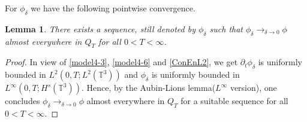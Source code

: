 \documentclass[reqno,a4paper,11pt]{amsart}
\theoremstyle{plain}
\newtheorem{lemma}[theorem]{Lemma}
\numberwithin{equation}{section}
\begin{document}
			For $\phi_{\delta}$ we have  the following pointwise convergence.
			\begin{lemma}\label{lem5.5}
				There exists a sequence, still denoted by $\phi_{\delta}$ such that $\phi_{\delta}\rightarrow_{\delta\rightarrow0}\phi$ almost everywhere in $Q_T$ for all $0<T<\infty$.
			\end{lemma}
			\begin{proof}
				In view of \eqref{model4-3}, \eqref{model4-6} and \eqref{ConEnL2}, we get $\partial_{t}\phi_{\delta}$ is uniformly bounded in  $L^{2}(0,T;L^{2}(\mathbb{T}^{3}))$ and $\phi_{\delta}$ is uniformly bounded in $L^{\infty}(0,T;H^{s}(\mathbb{T}^{3}))$. Hence, by the Aubin-Lions lemma($L^{\infty}$ version), one concludes $\phi_{\delta}\rightarrow_{\delta\rightarrow0}\phi$ almost everywhere in $Q_T$ for a suitable sequence for all $0<T<\infty$.
			\end{proof}
			
\end{document}
